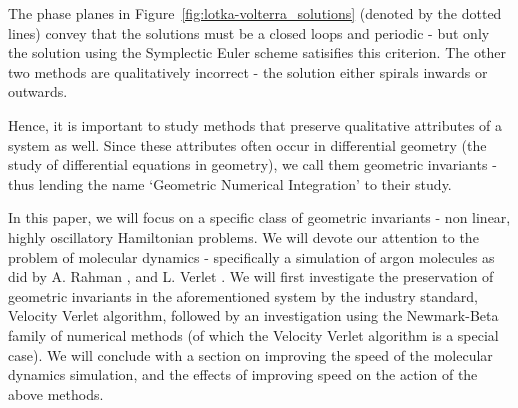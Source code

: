 \documentclass[../Main.tex]{subfiles}
\begin{document}
The phase planes in Figure~\ref{fig:lotka-volterra_solutions} (denoted by the dotted lines) convey that the solutions must be a closed loops and periodic - but only the solution using the Symplectic Euler scheme satisifies this criterion. The other two methods are qualitatively incorrect - the solution either spirals inwards or outwards.

Hence, it is important to study methods that preserve qualitative attributes of a system as well. Since these attributes often occur in differential geometry (the study of differential equations in geometry), we call them geometric invariants - thus lending the name `Geometric Numerical Integration' to their study.

In this paper, we will focus on a specific class of geometric invariants - non linear, highly oscillatory Hamiltonian problems. We will devote our attention to the problem of molecular dynamics - specifically a simulation of argon molecules as did by A. Rahman \cite{Rahman1964}, and L. Verlet \cite{Verlet1967}. We will first investigate the preservation of geometric invariants in the aforementioned system by the industry standard, Velocity Verlet algorithm, followed by an investigation using the Newmark-Beta family of numerical methods (of which the Velocity Verlet algorithm is a special case). We will conclude with a section on improving the speed of the molecular dynamics simulation, and the effects of improving speed on the action of the above methods.
\end{document}
